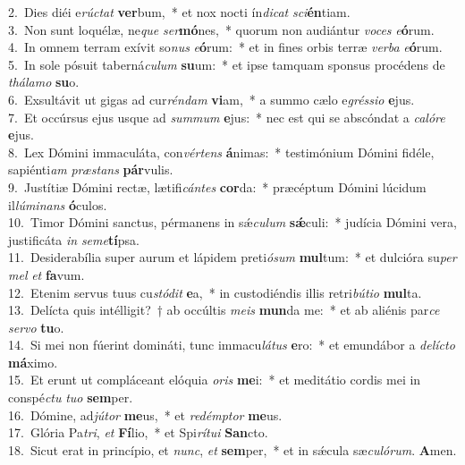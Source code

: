 {2.~}Dies diéi e\textit{rú}\textit{ctat} \textbf{ver}bum,~* et nox nocti ín\textit{di}\textit{cat} \textit{sci}\textbf{én}tiam.\\
{3.~}Non sunt loquélæ, ne\textit{que} \textit{ser}\textbf{mó}nes,~* quorum non audiántur \textit{vo}\textit{ces} \textit{e}\textbf{ó}rum.\\
{4.~}In omnem terram exívit so\textit{nus} \textit{e}\textbf{ó}rum:~* et in fines orbis terræ \textit{ver}\textit{ba} \textit{e}\textbf{ó}rum.\\
{5.~}In sole pósuit taberná\textit{cu}\textit{lum} \textbf{su}um:~* et ipse tamquam sponsus procédens de \textit{thá}\textit{la}\textit{mo} \textbf{su}o.\\
{6.~}Exsultávit ut gigas ad cur\textit{rén}\textit{dam} \textbf{vi}am,~* a summo cælo e\textit{grés}\textit{si}\textit{o} \textbf{e}jus.\\
{7.~}Et occúrsus ejus usque ad \textit{sum}\textit{mum} \textbf{e}jus:~* nec est qui se abscóndat a \textit{ca}\textit{ló}\textit{re} \textbf{e}jus.\\
{8.~}Lex Dómini immaculáta, con\textit{vér}\textit{tens} \textbf{á}nimas:~* testimónium Dómini fidéle, sapiénti\textit{am} \textit{præ}\textit{stans} \textbf{pár}vulis.\\
{9.~}Justítiæ Dómini rectæ, lætifi\textit{cán}\textit{tes} \textbf{cor}da:~* præcéptum Dómini lúcidum il\textit{lú}\textit{mi}\textit{nans} \textbf{ó}culos.\\
{10.~}Timor Dómini sanctus, pérmanens in sǽ\textit{cu}\textit{lum} \textbf{sǽ}culi:~* judícia Dómini vera, justificáta \textit{in} \textit{se}\textit{me}\textbf{tí}psa.\\
{11.~}Desiderabília super aurum et lápidem preti\textit{ó}\textit{sum} \textbf{mul}tum:~* et dulcióra su\textit{per} \textit{mel} \textit{et} \textbf{fa}vum.\\
{12.~}Etenim servus tuus cu\textit{stó}\textit{dit} \textbf{e}a,~* in custodiéndis illis retri\textit{bú}\textit{ti}\textit{o} \textbf{mul}ta.\\
{13.~}Delícta quis intélligit?~† ab occúltis \textit{me}\textit{is} \textbf{mun}da me:~* et ab aliénis par\textit{ce} \textit{ser}\textit{vo} \textbf{tu}o.\\
{14.~}Si mei non fúerint domináti, tunc immacu\textit{lá}\textit{tus} \textbf{e}ro:~* et emundábor a \textit{de}\textit{lí}\textit{cto} \textbf{má}ximo.\\
{15.~}Et erunt ut compláceant elóquia \textit{o}\textit{ris} \textbf{me}i:~* et meditátio cordis mei in conspé\textit{ctu} \textit{tu}\textit{o} \textbf{sem}per.\\
{16.~}Dómine, ad\textit{jú}\textit{tor} \textbf{me}us,~* et \textit{re}\textit{dém}\textit{ptor} \textbf{me}us.\\
{17.~}Glória Pa\textit{tri}, \textit{et} \textbf{Fí}lio,~* et Spi\textit{rí}\textit{tu}\textit{i} \textbf{San}cto.\\
{18.~}Sicut erat in princípio, et \textit{nunc}, \textit{et} \textbf{sem}per,~* et in sǽcula sæ\textit{cu}\textit{ló}\textit{rum}. \textbf{A}men.\\
